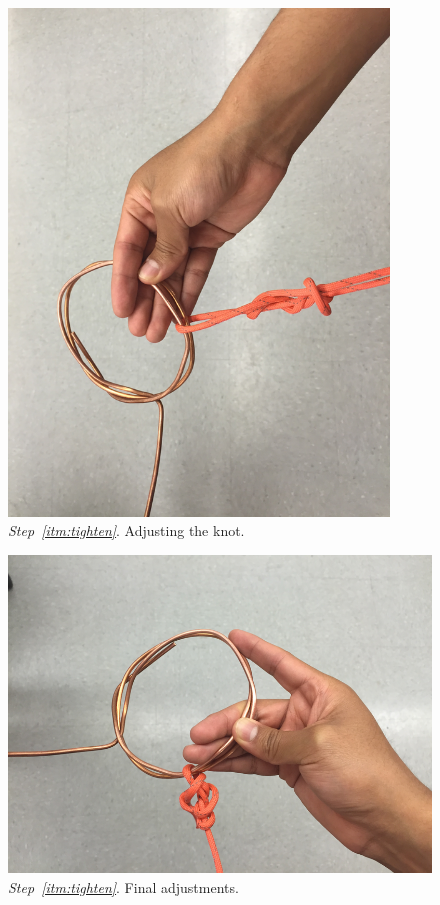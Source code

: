 \documentclass[12pt]{article}
\begin{document}
\begin{enumerate}
\begin{figure}[ht!]
    \centering
    \includegraphics[width=0.9\textwidth]{pic9.png}
    \caption{\textit{Step~\ref{itm:tighten}}. Adjusting the knot.}
    \label{fig:pic9}
 \end{figure}

\begin{figure}[ht!]
    \centering
    \includegraphics[width=1\textwidth]{pic10.png}
    \caption{\textit{Step~\ref{itm:tighten}}. Final adjustments.}
    \label{fig:pic10}
 \end{figure}


\end{enumerate}
\end{document}
